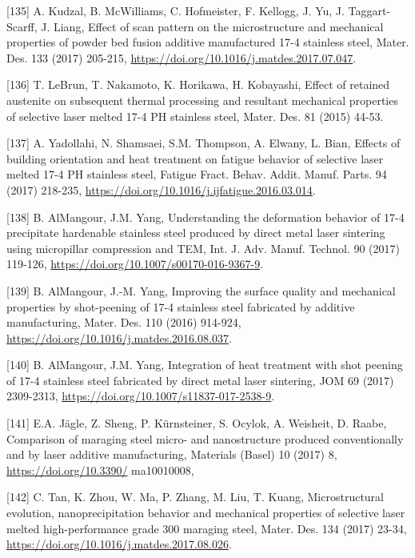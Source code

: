 \documentclass[10pt]{article}
\begin{document}
[135] A. Kudzal, B. McWilliams, C. Hofmeister, F. Kellogg, J. Yu, J. Taggart-Scarff, J. Liang, Effect of scan pattern on the microstructure and mechanical properties of powder bed fusion additive manufactured 17-4 stainless steel, Mater. Des. 133 (2017) 205-215, \href{https://doi.org/10.1016/j.matdes.2017.07.047}{https://doi.org/10.1016/j.matdes.2017.07.047}.

[136] T. LeBrun, T. Nakamoto, K. Horikawa, H. Kobayashi, Effect of retained austenite on subsequent thermal processing and resultant mechanical properties of selective laser melted 17-4 PH stainless steel, Mater. Des. 81 (2015) 44-53.

[137] A. Yadollahi, N. Shamsaei, S.M. Thompson, A. Elwany, L. Bian, Effects of building orientation and heat treatment on fatigue behavior of selective laser melted 17-4 PH stainless steel, Fatigue Fract. Behav. Addit. Manuf. Parts. 94 (2017) 218-235, \href{https://doi.org/10.1016/j.ijfatigue.2016.03.014}{https://doi.org/10.1016/j.ijfatigue.2016.03.014}.

[138] B. AlMangour, J.M. Yang, Understanding the deformation behavior of 17-4 precipitate hardenable stainless steel produced by direct metal laser sintering using micropillar compression and TEM, Int. J. Adv. Manuf. Technol. 90 (2017) 119-126, \href{https://doi.org/10.1007/s00170-016-9367-9}{https://doi.org/10.1007/s00170-016-9367-9}.

[139] B. AlMangour, J.-M. Yang, Improving the surface quality and mechanical properties by shot-peening of 17-4 stainless steel fabricated by additive manufacturing, Mater. Des. 110 (2016) 914-924, \href{https://doi.org/10.1016/j.matdes.2016.08.037}{https://doi.org/10.1016/j.matdes.2016.08.037}.

[140] B. AlMangour, J.M. Yang, Integration of heat treatment with shot peening of 17-4 stainless steel fabricated by direct metal laser sintering, JOM 69 (2017) 2309-2313, \href{https://doi.org/10.1007/s11837-017-2538-9}{https://doi.org/10.1007/s11837-017-2538-9}.

[141] E.A. Jägle, Z. Sheng, P. Kürnsteiner, S. Ocylok, A. Weisheit, D. Raabe, Comparison of maraging steel micro- and nanostructure produced conventionally and by laser additive manufacturing, Materials (Basel) 10 (2017) 8, \href{https://doi.org/10.3390/}{https://doi.org/10.3390/} ma10010008,

[142] C. Tan, K. Zhou, W. Ma, P. Zhang, M. Liu, T. Kuang, Microstructural evolution, nanoprecipitation behavior and mechanical properties of selective laser melted high-performance grade 300 maraging steel, Mater. Des. 134 (2017) 23-34, \href{https://doi.org/10.1016/j.matdes.2017.08.026}{https://doi.org/10.1016/j.matdes.2017.08.026}.
\end{document}
